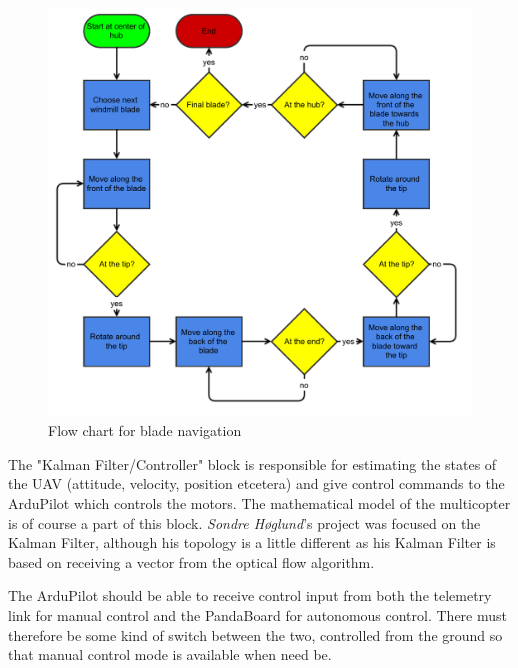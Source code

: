 \begin{figure}[ht!]
\centering
\includegraphics[scale=0.75]{./Chapter6/Pics/flowuav.pdf}
\caption[Flow Chart]{Flow chart for blade navigation}
\label{flow}
\end{figure}
The "Kalman Filter/Controller" block is responsible for estimating the states of the UAV (attitude, velocity, position etcetera) and give control commands to the ArduPilot which controls the motors. The mathematical model of the multicopter is of course a part of this block. \emph{Sondre Høglund}'s project was focused on the Kalman Filter, although his topology is a little different as his Kalman Filter is based on receiving a vector from the optical flow algorithm.

The ArduPilot should be able to receive control input from both the telemetry link for manual control and the PandaBoard for autonomous control. There must therefore be some kind of switch between the two, controlled from the ground so that manual control mode is available when need be.